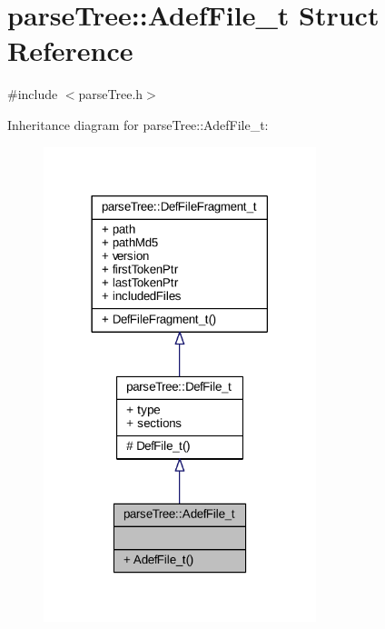 \hypertarget{structparse_tree_1_1_adef_file__t}{}\section{parse\+Tree\+:\+:Adef\+File\+\_\+t Struct Reference}
\label{structparse_tree_1_1_adef_file__t}


{\ttfamily \#include $<$parse\+Tree.\+h$>$}



Inheritance diagram for parse\+Tree\+:\+:Adef\+File\+\_\+t\+:
\nopagebreak
\begin{figure}[H]
\begin{center}
\leavevmode
\includegraphics[width=225pt]{structparse_tree_1_1_adef_file__t__inherit__graph}
\end{center}
\end{figure}



